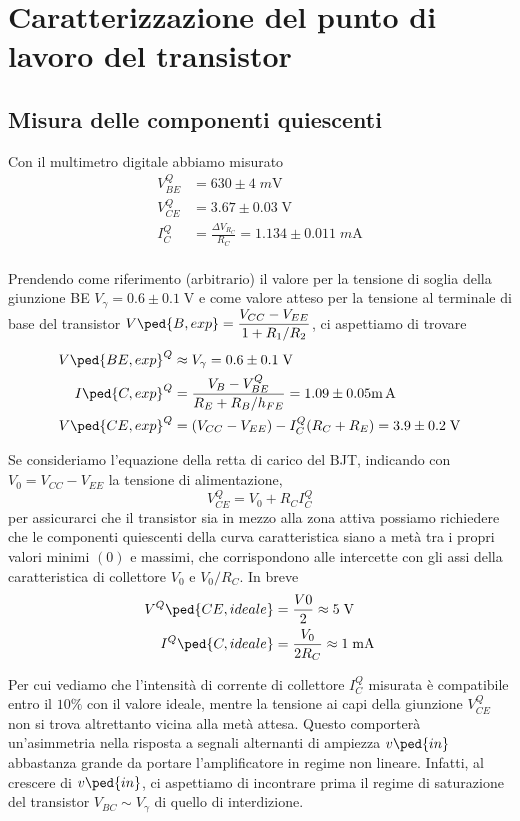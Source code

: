 \documentclass[10pt,a4paper]{article}
\begin{document}
\section{Caratterizzazione del punto di lavoro del transistor}
\subsection{Misura delle componenti quiescenti}
Con il multimetro digitale abbiamo misurato
\begin{align*}
V_{BE}^Q &= 630 \pm 4 \; \si{m\V} \\
V_{CE}^Q &= 3.67 \pm 0.03 \; \si{\V} \\
I_C^Q &= \frac{\Delta V_{R_C}}{R_C} = 1.134 \pm 0.011 \; \si{m\A} \\
\end{align*}

Prendendo come riferimento (arbitrario) il valore per la tensione di soglia
della giunzione BE $V_\gamma = 0.6 \pm 0.1 \; \si{\V}$ e come valore atteso
per la tensione al terminale di base del transistor
$\ds V\ped{B, exp} = \frac{V_{CC} - V_{EE}}{1 + R_1/R_2}$, ci aspettiamo di
trovare
\begin{align*}
V\ped{BE, exp}^Q &\approx V_\gamma = 0.6 \pm 0.1 \; \si{\V} \\
I\ped{C, exp}^Q &= \frac{V_B - V_{BE}^Q}{R_E + R_B/h_{FE}} =
1.09 \pm 0.05 \si{\m\A} \\
V\ped{CE, exp}^Q &= (V_{CC} - V_{EE}) - I_C^Q(R_C + R_E) = 3.9 \pm 0.2 \;
\si{\V}
\end{align*}

Se consideriamo l'equazione della retta di carico del BJT, indicando con
$V_0 = V_{CC} - V_{EE}$ la tensione di alimentazione,
\begin{equation*}
V_{CE}^Q = V_0 + R_C I_C^Q
\end{equation*}
per assicurarci che il transistor sia in mezzo alla zona attiva possiamo
richiedere che le componenti quiescenti della curva caratteristica siano a
metà tra i propri valori minimi $(0)$ e massimi, che corrispondono alle
intercette con gli assi della caratteristica di collettore $V_0$ e $V_0/R_C$.
In breve
\begin{align*}
V^Q\ped{CE, ideale} &= \frac{V0}{2} \approx 5 \; \si{\V} \\
I^Q\ped{C, ideale} &= \frac{V_0}{2R_C} \approx 1 \; \si{\mA}
\end{align*}

Per cui vediamo che l'intensità di corrente di collettore $I_C^Q$ misurata è
compatibile entro il $10 \%$ con il valore ideale, mentre la tensione ai capi
della giunzione $V_{CE}^Q$ non si trova altrettanto vicina alla metà attesa.
Questo comporterà un'asimmetria nella risposta a segnali alternanti di
ampiezza $v\ped{in}$ abbastanza grande da portare l'amplificatore in regime
non lineare. Infatti, al crescere di $v\ped{in}$, ci aspettiamo di incontrare
prima il regime di saturazione del transistor $V_{BC} \sim V_\gamma$ di quello
di interdizione.
  
\end{document}
